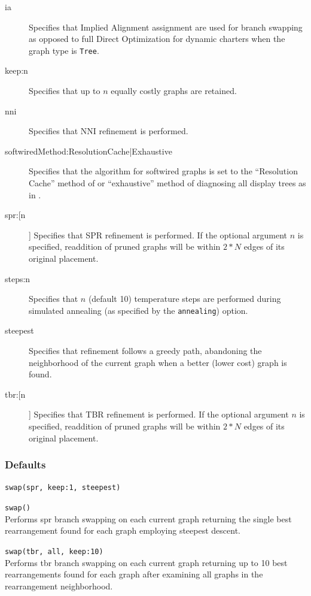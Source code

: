 \begin{description}
			\item[ia] Specifies that Implied Alignment \citep{Wheeler2003} assignment are used for 
			branch swapping as opposed to full Direct Optimization for dynamic charters when the 
			graph type is \texttt{Tree}.
		
			\item[keep:n] Specifies that up to $n$ equally costly graphs are retained.
		
			\item[nni] Specifies that NNI refinement \citep{CaminandSokal1965, Robinson1971} is performed.
			
			\item[softwiredMethod:ResolutionCache|Exhaustive] Specifies that the algorithm for softwired graphs 
			is set to the ``Resolution Cache'' method of \cite{WheelerandWashburn2023} or ``exhaustive'' 
			method of diagnosing all display trees as in \cite{Wheeler2015}.
		
			\item[spr:[n]] Specifies that SPR refinement \citep{Dayhoff1969} is performed. If the optional 
			argument $n$ is specified, readdition of pruned graphs will be within $2 * N$ edges of its original 
			placement.
		
			\item[steps:n] Specifies that $n$ (default 10) temperature steps are performed during simulated 
			annealing (as specified by the \texttt{annealing}) option.
		
			\item[steepest] Specifies that refinement follows a greedy path, abandoning the neighborhood 
			of the current graph when a better (lower cost) graph is found.
		
			\item[tbr:[n]] Specifies that TBR refinement \citep{Farris1988, swofford1990a} is performed. If the 
			optional argument $n$ is specified, readdition of pruned graphs will be within $2 * N$ edges of its 
			original placement.
		\end{description}	
		
		\subsubsection{Defaults}
			\texttt{swap(spr, keep:1, steepest)}
		
		\begin{example}
			\item{\texttt{swap()}\\Performs spr branch swapping on each current graph returning the single 
			best rearrangement found for each graph employing steepest descent.}
			
			\item{\texttt{swap(tbr, all, keep:10)}\\Performs tbr branch swapping on each current graph 
			returning up to 10 best rearrangements found for each graph after examining all graphs in 
			the rearrangement neighborhood.}
		\end{example}
	
